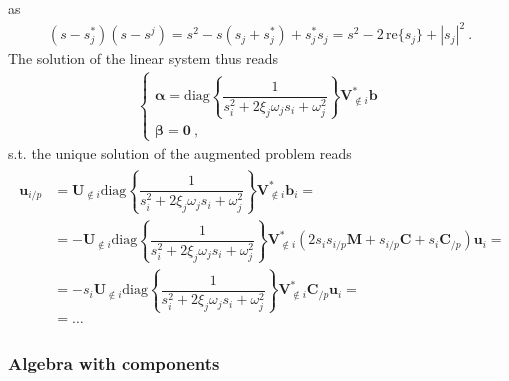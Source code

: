 \documentclass[letterpaper,10pt,english]{jupyterBook}
\begin{document}
\begin{itemize}
\begin{equation*}
\end{equation*}
\sphinxAtStartPar
as
\begin{equation*}
\begin{split}(s - s_j^* ) (s - s^j ) = s^2 - s (s_j + s_j^*) + s_j^* s_j = s^2 - 2 \, \text{re}\{ s_j \} + |s_j|^2 \ .\end{split}
\end{equation*}
\sphinxAtStartPar
The solution of the linear system thus reads
\begin{equation*}
\begin{split}\begin{cases}
    \boldsymbol\alpha = \text{diag}\left\{ \dfrac{1}{s_i^2 + 2 \xi_j \omega_j s_i + \omega_j^2} \right\} \mathbf{V}^*_{\notin i} \mathbf{b} \\
    \boldsymbol\beta = \mathbf{0} \ ,
  \end{cases}\end{split}
\end{equation*}
\sphinxAtStartPar
s.t. the unique solution of the augmented problem reads
\begin{equation*}
\begin{split}\begin{aligned}
    \mathbf{u}_{i/p} 
    & = \mathbf{U}_{\notin i} \text{diag}\left\{ \dfrac{1}{s_i^2 + 2 \xi_j \omega_j s_i + \omega_j^2} \right\} \mathbf{V}^*_{\notin i} \mathbf{b}_i = \\
    & = - \mathbf{U}_{\notin i} \text{diag}\left\{ \dfrac{1}{s_i^2 + 2 \xi_j \omega_j s_i + \omega_j^2} \right\} \mathbf{V}^*_{\notin i} \left( 2 s_i s_{i/p} \mathbf{M} + s_{i/p} \mathbf{C} + s_i \mathbf{C}_{/p} \right) \mathbf{u}_i = \\
    & = - s_i \mathbf{U}_{\notin i} \text{diag}\left\{ \dfrac{1}{s_i^2 + 2 \xi_j \omega_j s_i + \omega_j^2} \right\} \mathbf{V}^*_{\notin i} \mathbf{C}_{/p} \mathbf{u}_i = \\
    & = \dots
  \end{aligned}\end{split}
\end{equation*}
\end{itemize}
\subsubsection*{Algebra with components}
\end{document}
